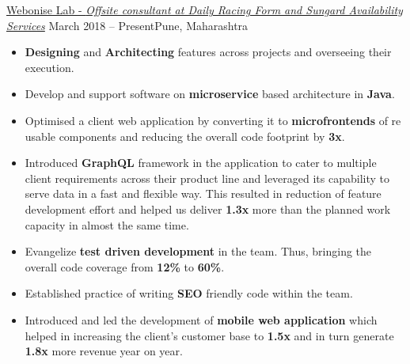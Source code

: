 \documentclass[10pt,a4paper,ragged2e,withhyper]{altacv}
\begin{document}
\begin{paracol}{2}


  {\href{https://www.webonise.com/}{Webonise Lab - \textit{Offsite consultant at Daily Racing Form and Sungard Availability Services}} }
{March 2018 -- Present}{Pune, Maharashtra}
\begin{itemize}
\item \textbf{Designing} and \textbf{Architecting} features across projects and overseeing their execution.
\item Develop and support software on \textbf{microservice} based architecture in \textbf{Java}.
\item Optimised a client web application by converting it to \textbf{microfrontends} of re usable components and reducing the overall code footprint by \textbf{3x}.
\item Introduced \textbf{GraphQL} framework in the application to cater to multiple client requirements across their product line and leveraged its capability to serve data in a fast and flexible way. This resulted in reduction of feature development effort and helped us deliver \textbf{1.3x} more than the planned work capacity in almost the same time.
\item Evangelize \textbf{test driven development} in the team. Thus, bringing the overall code coverage from \textbf{12\%} to \textbf{60\%}.
\item Established practice of writing \textbf{SEO} friendly code within the team.
\item Introduced and led the development of \textbf{mobile web application} which helped in increasing the client's customer base to \textbf{1.5x} and in turn generate \textbf{1.8x} more revenue year on year.

\end{itemize}
\end{paracol}
\end{document}
